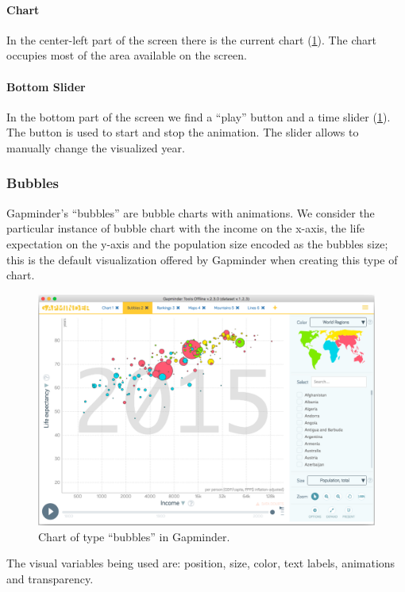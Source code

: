 \paragraph{Chart}
In the center-left part of the screen there is the current chart (\cref{fig:bubbles}).
The chart occupies most of the area available on the screen.

\paragraph{Bottom Slider}
In the bottom part of the screen we find a ``play'' button and a time slider (\cref{fig:bubbles}).
The button is used to start and stop the animation.
The slider allows to manually change the visualized year.


\subsubsection{Bubbles}
\label{subsubsec:bubbles}
Gapminder's ``bubbles'' are bubble charts with animations.
We consider the particular instance of bubble chart with the income on the x-axis, the life expectation on the y-axis and the population size encoded as the bubbles size; this is the default visualization offered by Gapminder when creating this type of chart.

\begin{figure}[h]
	\centering
	\includegraphics[width=0.95\columnwidth]{figures/bubbles}
	\caption{Chart of type ``bubbles'' in Gapminder.}
	\label{fig:bubbles}
\end{figure}

The visual variables being used are: position, size, color, text labels, animations and transparency.

